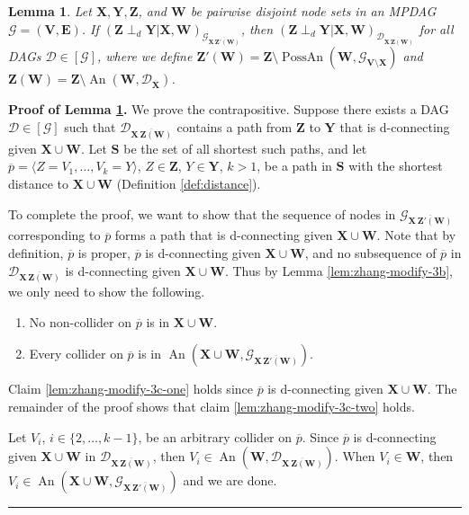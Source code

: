 \documentclass[11pt]{article}
\DeclareMathOperator{\An}{An}
\DeclareMathOperator{\PossAn}{PossAn}
\newcommand{\BlackBox}{\rule{1.5ex}{1.5ex}}  %
\newtheorem{lemma}[theorem]{Lemma}
\newcommand{\mb}[1]{\mathbf{#1}}
\newcommand{\dsepp}{\perp_{d}}
\newcommand{\g}[1][G]{\mathcal{#1}}
\newenvironment{proofof}[1][]{\noindent \textbf{Proof of #1.}}{\hfill\BlackBox}
\begin{document}

\begin{lemma}
\label{lem:zhang-modify-3c}
    Let $\mb{X,Y,Z}$, and $\mb{W}$ be pairwise disjoint node sets in an MPDAG $\g = (\mb{V,E})$. If $(\mb{Z} \dsepp \mb{Y} |\mb{X}, \mb{W})_{\g_{\overline{\mb{X \, Z'(W)}}}}$, then $(\mb{Z} \dsepp \mb{Y} |\mb{X}, \mb{W})_{\g[D]_{\overline{\mb{X \, Z(W)}}}}$ for all DAGs $\g[D] \in [\g]$, where we define $\mb{Z'(W)} = \mb{Z} \setminus \PossAn(\mb{W}, \g_{\mb{V \setminus X}})$ and $\mb{Z(W)} = \mb{Z} \setminus \An(\mb{W}, \g[D]_{\overline{\mb{X}}})$.
\end{lemma}


\begin{proofof}[Lemma \ref{lem:zhang-modify-3c}]
    We prove the contrapositive. Suppose there exists a DAG $\g[D] \in [\g]$ such that $\g[D]_{\overline{\mb{X \, Z(W)}}}$ contains a path from $\mb{Z}$ to $\mb{Y}$ that is d-connecting given $\mb{X} \cup \mb{W}$. Let $\mb{S}$ be the set of all shortest such paths, and let $\overline{p} = \langle Z=V_1, \dots, V_k=Y \rangle$, $Z \in \mb{Z}$, $Y \in \mb{Y}$, $k >1$, be a path in $\mb{S}$ with the shortest distance to $\mb{X} \cup \mb{W}$ (Definition \ref{def:distance}).

    To complete the proof, we want to show that the sequence of nodes in $\g_{\overline{\mb{X \, Z'(W)}}}$ corresponding to $\overline{p}$ forms a path that is d-connecting given $\mb{X} \cup \mb{W}$. Note that by definition, $\overline{p}$ is proper, $\overline{p}$ is d-connecting given $\mb{X} \cup \mb{W}$, and no subsequence of $\overline{p}$ in $\g[D]_{\overline{\mb{X \, Z(W)}}}$ is d-connecting given $\mb{X} \cup \mb{W}$. Thus by Lemma \ref{lem:zhang-modify-3b}, we only need to show the following.
    \begin{enumerate}[label=(\roman*)]
        \item\label{lem:zhang-modify-3c-one}
        No non-collider on $\overline{p}$ is in $\mb{X} \cup \mb{W}$.
        
        \item\label{lem:zhang-modify-3c-two}
        Every collider on $\overline{p}$ is in $\An(\mb{X} \cup \mb{W}, \g_{\overline{\mb{X \, Z'(W)}}})$.
    \end{enumerate}
    Claim \ref{lem:zhang-modify-3c-one} holds since $\overline{p}$ is d-connecting given $\mb{X} \cup \mb{W}$. The remainder of the proof shows that claim \ref{lem:zhang-modify-3c-two} holds.

    Let $V_i$, $i \in \{2, \dots, k-1\}$, be an arbitrary collider on $\overline{p}$. Since $\overline{p}$ is d-connecting given $\mb{X} \cup \mb{W}$ in $\g[D]_{\overline{\mb{X \, Z(W)}}}$, then $V_i \in \An(\mb{W}, \g[D]_{\overline{\mb{X \, Z(W)}}})$. When $V_i \in \mb{W}$, then $V_i \in \An(\mb{X} \cup \mb{W}, \g_{\overline{\mb{X \, Z'(W)}}})$ and we are done.


\end{proofof}
\end{document}

